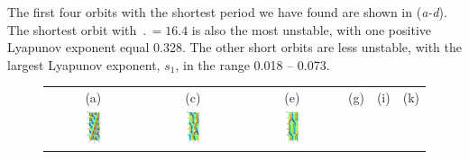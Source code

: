 The first four orbits with the shortest period we have found are
shown in (\textit{a-d}).  The shortest orbit with
$\period{} = 16.4$ is also the most unstable, with one positive
Lyapunov exponent equal 0.328.  The other short orbits are less
unstable, with the largest Lyapunov exponent, $s_1$, in the range
0.018 -- 0.073.


\begin{figure}[t]
\begin{center}
\begin{tabular}{cccccc} (a) & (c) & (e) & (g) & (i) & (k)\\
\includegraphics[width=0.15\textwidth]{figs/ks22rpo016.3-02.86.eps}\hspace{-3ex} &
\includegraphics[width=0.15\textwidth]{figs/ks22rpo033.5-04.04.eps}\hspace{-3ex} &
\includegraphics[width=0.15\textwidth]{figs/ks22rpo047.6-05.68.eps}\hspace{-3ex} &

\end{tabular}
\end{center}
\end{figure}
